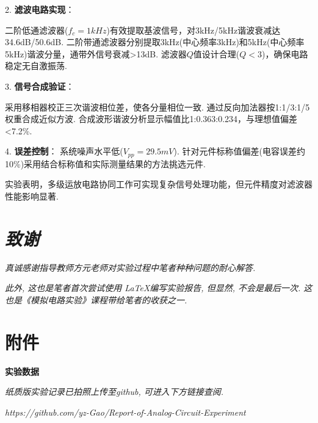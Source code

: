 \documentclass[UTF2]{ctexart}
\begin{document}
	2. \textbf{滤波电路实现}：
	
	二阶低通滤波器($f_c=1kHz$)有效提取基波信号，对3kHz/5kHz谐波衰减达34.6dB/50.6dB. 二阶带通滤波器分别提取3kHz(中心频率3kHz)和5kHz(中心频率5kHz)谐波分量，通带外信号衰减>13dB. 滤波器$Q$值设计合理($Q<3$)，确保电路稳定无自激振荡.
	
	3. \textbf{信号合成验证}：
	
	采用移相器校正三次谐波相位差，使各分量相位一致.
	通过反向加法器按1:1/3:1/5权重合成近似方波.
	合成波形谐波分析显示幅值比1:0.363:0.234，与理想值偏差<7.2\%.
	
	4. \textbf{误差控制}：
	系统噪声水平低($V_{pp}=29.5mV$).
	针对元件标称值偏差(电容误差约10\%)采用结合标称值和实际测量结果的方法挑选元件.
	
	实验表明，多级运放电路协同工作可实现复杂信号处理功能，但元件精度对滤波器性能影响显著.
	
	\newpage
	
	\section{\textit{致谢}}
	
	\textit{真诚感谢指导教师方元老师对实验过程中笔者种种问题的耐心解答.}
	
	\textit{此外, 这也是笔者首次尝试使用 \LaTeX 编写实验报告, 但显然, 不会是最后一次. 这也是《模拟电路实验》课程带给笔者的收获之一.	}
	\newpage
	
	\section{附件}
	
	\textbf{实验数据} %
	
	\textit{纸质版实验记录已拍照上传至github, 可进入下方链接查阅.}
	
	\textit{https://github.com/yz-Gao/Report-of-Analog-Circuit-Experiment}
	
	
\end{document}

